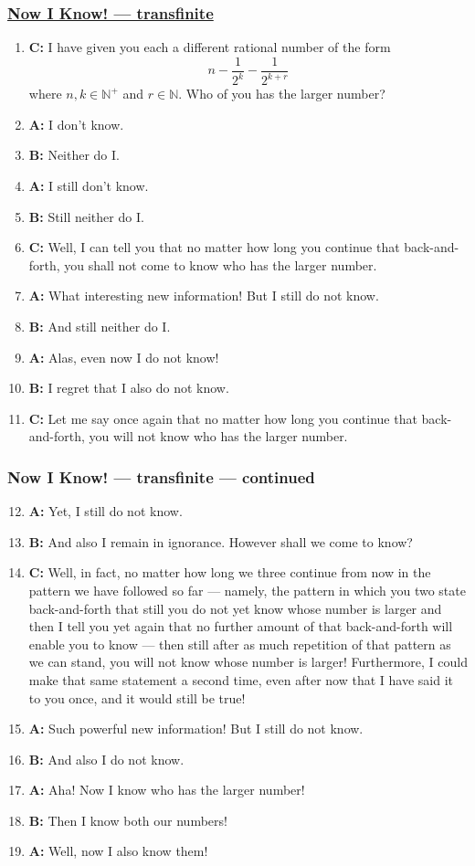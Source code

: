 \documentclass[UTF8,aspectratio=43,11pt,colorlinks,compress,openany]{beamer}%
\begin{document}
\begin{frame}\frametitle{\href{http://jdh.hamkins.org/now-i-know/}{Now I Know! --- transfinite}}
\vspace{-1ex}
	\begin{enumerate}
		\item \textbf{C:} I have given you each a different rational number of the form \[n-\frac{1}{2^k}-\frac{1}{2^{k+r}}\]
		where $n,k\in\mathbb{N}^+$ and $r\in\mathbb{N}$. Who of you has the larger number?
		\item \textbf{A:} I don't know.
		\item \textbf{B:} Neither do I.
		\item \textbf{A:} I still don't know.
		\item \textbf{B:} Still neither do I.
		\item \textbf{C:} Well, I can tell you that no matter how long you continue that back-and-forth, you shall not come to know who has the larger number.
		\item \textbf{A:} What interesting new information! But I still do not know.
		\item \textbf{B:} And still neither do I.
		\item \textbf{A:} Alas, even now I do not know!
		\item \textbf{B:} I regret that I also do not know.
		\item \textbf{C:} Let me say once again that no matter how long you continue that back-and-forth, you will not know who has the larger number.
	\end{enumerate}
\end{frame}

\begin{frame}\frametitle{Now I Know! --- transfinite --- continued}
	\begin{enumerate}\setcounter{enumi}{11}
		\item \textbf{A:} Yet, I still do not know.
		\item \textbf{B:} And also I remain in ignorance. However shall we come to know?
		\item \textbf{C:} Well, in fact, no matter how long we three continue from now in the pattern we have followed so far --- namely, the pattern in which you two state back-and-forth that still you do not yet know whose number is larger and then I tell you yet again that no further amount of that back-and-forth will enable you to know --- then still after as much repetition of that pattern as we can stand, you will not know whose number is larger! Furthermore, I could make that same statement a second time, even after now that I have said it to you once, and it would still be true!
		\item \textbf{A:} Such powerful new information! But I still do not know.
		\item \textbf{B:} And also I do not know.
		\item \textbf{A:} Aha! Now I know who has the larger number!
		\item \textbf{B:} Then I know both our numbers!
		\item \textbf{A:} Well, now I also know them!
	\end{enumerate}
\end{frame}
\end{document}
